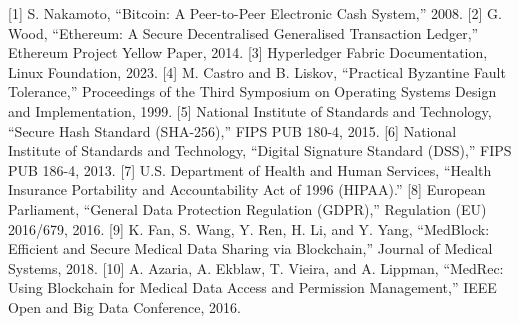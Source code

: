 [1] S. Nakamoto, ``Bitcoin: A Peer-to-Peer Electronic Cash System,'' 2008.
[2] G. Wood, ``Ethereum: A Secure Decentralised Generalised Transaction Ledger,'' Ethereum Project Yellow Paper, 2014.
[3] Hyperledger Fabric Documentation, Linux Foundation, 2023.
[4] M. Castro and B. Liskov, ``Practical Byzantine Fault Tolerance,'' Proceedings of the Third Symposium on Operating Systems Design and Implementation, 1999.
[5] National Institute of Standards and Technology, ``Secure Hash Standard (SHA-256),'' FIPS PUB 180-4, 2015.
[6] National Institute of Standards and Technology, ``Digital Signature Standard (DSS),'' FIPS PUB 186-4, 2013.
[7] U.S. Department of Health and Human Services, ``Health Insurance Portability and Accountability Act of 1996 (HIPAA).''
[8] European Parliament, ``General Data Protection Regulation (GDPR),'' Regulation (EU) 2016/679, 2016.
[9] K. Fan, S. Wang, Y. Ren, H. Li, and Y. Yang, ``MedBlock: Efficient and Secure Medical Data Sharing via Blockchain,'' Journal of Medical Systems, 2018.
[10] A. Azaria, A. Ekblaw, T. Vieira, and A. Lippman, ``MedRec: Using Blockchain for Medical Data Access and Permission Management,'' IEEE Open and Big Data Conference, 2016.